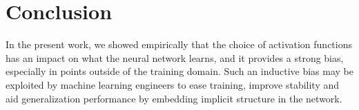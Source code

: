 \documentclass{article}
\begin{document}
\section{Conclusion}
\label{Conclusion}
In the present work, we showed empirically that the choice of activation functions has an impact on what the neural network learns, and it provides a strong bias, especially in points outside of the training domain. Such an inductive bias may be exploited by machine learning engineers to ease training, improve stability and aid generalization performance by embedding implicit structure in the network. 



\printbibliography
\end{document}
